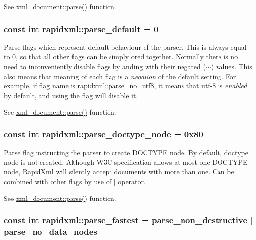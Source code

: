 \par
 See \hyperlink{classrapidxml_1_1xml__document_ad510b0c5fd8bf0180a55ffb2476e59e4}{xml\_\-document::parse()} function. \hypertarget{namespacerapidxml_acf4edf952f59eb1b6124ea37ad7da3ab}{
\subsubsection[{parse\_\-default}]{\setlength{\rightskip}{0pt plus 5cm}const int {\bf rapidxml::parse\_\-default} = 0}}
\label{d7/d8a/namespacerapidxml_acf4edf952f59eb1b6124ea37ad7da3ab}
Parse flags which represent default behaviour of the parser. This is always equal to 0, so that all other flags can be simply ored together. Normally there is no need to inconveniently disable flags by anding with their negated ($\sim$) values. This also means that meaning of each flag is a {\itshape negation\/} of the default setting. For example, if flag name is \hyperlink{namespacerapidxml_a22d4aefaceb00d7afabfef7107b108da}{rapidxml::parse\_\-no\_\-utf8}, it means that utf-\/8 is {\itshape enabled\/} by default, and using the flag will disable it. \par
\par
 See \hyperlink{classrapidxml_1_1xml__document_ad510b0c5fd8bf0180a55ffb2476e59e4}{xml\_\-document::parse()} function. \hypertarget{namespacerapidxml_a41002b49780a90a0bbcc28ce8b895fe4}{
\subsubsection[{parse\_\-doctype\_\-node}]{\setlength{\rightskip}{0pt plus 5cm}const int {\bf rapidxml::parse\_\-doctype\_\-node} = 0x80}}
\label{d7/d8a/namespacerapidxml_a41002b49780a90a0bbcc28ce8b895fe4}
Parse flag instructing the parser to create DOCTYPE node. By default, doctype node is not created. Although W3C specification allows at most one DOCTYPE node, RapidXml will silently accept documents with more than one. Can be combined with other flags by use of $|$ operator. \par
\par
 See \hyperlink{classrapidxml_1_1xml__document_ad510b0c5fd8bf0180a55ffb2476e59e4}{xml\_\-document::parse()} function. \hypertarget{namespacerapidxml_a64da06dfdab7c86ca954bda4fecb978f}{
\subsubsection[{parse\_\-fastest}]{\setlength{\rightskip}{0pt plus 5cm}const int {\bf rapidxml::parse\_\-fastest} = {\bf parse\_\-non\_\-destructive} $|$ {\bf parse\_\-no\_\-data\_\-nodes}}}
